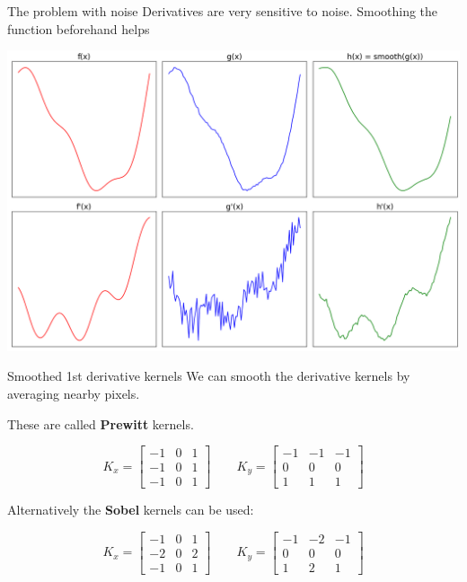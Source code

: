 \documentclass[9pt, aspectratio=169]{beamer}
\begin{document}
\begin{frame}
    {The problem with noise}
    Derivatives are very sensitive to noise. Smoothing the function beforehand helps

    \centering
    \includegraphics[width=.7\textwidth]{derivative_noise.png}
\end{frame}

\begin{frame}
    {Smoothed 1st derivative kernels}
    We can smooth the derivative kernels by averaging nearby pixels.

    These are called \textbf{Prewitt} kernels.

    $$K_x = \begin{bmatrix}-1&0&1\\-1&0&1\\-1&0&1\end{bmatrix} \qquad K_y = \begin{bmatrix}-1&-1&-1\\0&0&0\\1&1&1\end{bmatrix}$$

    Alternatively the \textbf{Sobel} kernels can be used:

    $$K_x = \begin{bmatrix}-1&0&1\\-2&0&2\\-1&0&1\end{bmatrix} \qquad K_y = \begin{bmatrix}-1&-2&-1\\0&0&0\\1&2&1\end{bmatrix}$$
\end{frame}
\end{document}
